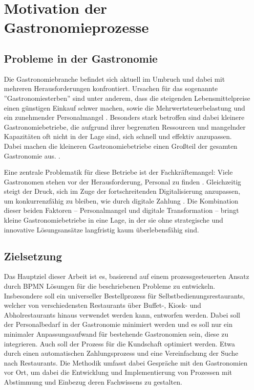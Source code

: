 \section{Motivation der Gastronomieprozesse}
\subsection{Probleme in der Gastronomie}
Die Gastronomiebranche befindet sich aktuell im Umbruch und dabei mit mehreren Herausforderungen konfrontiert. Ursachen für das sogenannte ''Gastronomiesterben'' sind unter anderem, dass die steigenden Lebensmittelpreise einen günstigen Einkauf schwer machen, sowie die Mehrwertsteuerbelastung und ein zunehmender Personalmangel \citep[vgl.][]{graefe_systemgastronomie_2018} \citep[vgl.][]{graefe_catering_2017}. Besonders stark betroffen sind dabei kleinere Gastronomiebetriebe, die aufgrund ihrer begrenzten Ressourcen und mangelnder Kapazitäten oft nicht in der Lage sind, sich schnell und effektiv anzupassen. \citep[vgl.][]{graefe_themenseite_2024} Dabei machen die kleineren Gastronomiebetriebe einen Großteil der gesamten Gastronomie aus. \citep[vgl.][]{gruner_deutsche_2016}. 

Eine zentrale Problematik für diese Betriebe ist der Fachkräftemangel: Viele Gastronomen stehen vor der Herausforderung, Personal zu finden \citep[vgl.][]{graefe_systemgastronomie_2018}. Gleichzeitig steigt der Druck, sich im Zuge der fortschreitenden Digitalisierung anzupassen, um konkurrenzfähig zu bleiben, wie durch digitale Zahlung \citep[vgl.][]{graefe_themenseite_2024}. Die Kombination dieser beiden Faktoren – Personalmangel und digitale Transformation – bringt kleine Gastronomiebetriebe in eine Lage, in der sie ohne strategische und innovative Lösungsansätze langfristig kaum überlebensfähig sind.

\subsection{Zielsetzung}
Das Hauptziel dieser Arbeit ist es, basierend auf einem prozessgesteuerten Ansatz durch BPMN Lösungen für die beschriebenen Probleme zu entwickeln.
Insbesondere soll ein universeller Bestellprozess für Selbstbedienungsrestaurants, welcher von verschiedensten Restaurants über Buffet-, Kiosk- und Abholrestaurants hinaus verwendet werden kann, entworfen werden. Dabei soll der Personalbedarf in der Gastronomie minimiert werden und es soll nur ein minimaler Anpassungsaufwand für bestehende Gastronomien sein, diese zu integrieren.
Auch soll der Prozess für die Kundschaft optimiert werden. Etwa durch einen automatischen Zahlungsprozess und eine Vereinfachung der Suche nach Restaurants.
Die Methodik umfasst dabei Gespräche mit den Gastronomien vor Ort, um dabei die Entwicklung und Implementierung von Prozessen mit Abstimmung und Einbezug deren Fachwissens zu gestalten.

